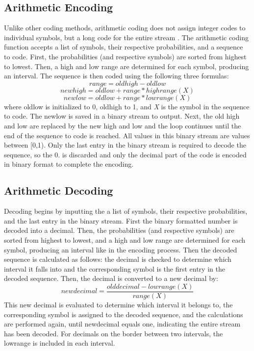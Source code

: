 \documentclass[11pt,a4paper,table]{article}
\begin{document}
\subsection{Arithmetic Encoding}
Unlike other coding methods, arithmetic coding does not assign integer codes to individual symbols, but a long code for the entire stream \cite{Salomon2007}. The arithmetic coding function accepts a list of symbols, their respective probabilities, and a sequence to code. First, the probabilities (and respective symbols) are sorted from highest to lowest. Then, a high and low range are determined for each symbol, producing an interval. The sequence is then coded using the following three formulas:
\begin{equation}
range = oldhigh - oldlow
\end{equation}
\begin{equation}
newhigh = oldlow + range*highrange(X)
\end{equation}
\begin{equation}
newlow = old low + range*lowrange(X)
\end{equation}
where oldlow is initialized to 0, oldhigh to 1, and \textit{X} is the symbol in the sequence to code. The newlow is saved in a binary stream to output. Next, the old high and low are replaced by the new high and low and the loop continues until the end of the sequence to code is reached. All values in this binary stream are values between [0,1). Only the last entry in the binary stream is required to decode the sequence, so the 0. is discarded and only the decimal part of the code is encoded in binary format to complete the encoding.

\subsection{Arithmetic Decoding}
Decoding begins by inputting the a list of symbols, their respective probabilities, and the last entry in the binary stream. First the binary formatted number is decoded into a decimal. Then, the probabilities (and respective symbols) are sorted from highest to lowest, and a high and low range are determined for each symbol, producing an interval like in the encoding process. Then the decoded sequence is calculated as follows: the decimal is checked to determine which interval it falls into and the corresponding symbol is the first entry in the decoded sequence. Then, the decimal is converted to a new decimal by:
 \begin{equation}
newdecimal = \frac{olddecimal - lowrange(X)}{range(X)}
\end{equation}
This new decimal is evaluated to determine which interval it belongs to, the corresponding symbol is assigned to the decoded sequence, and the calculations are performed again, until newdecimal equals one, indicating the entire stream has been decoded. For decimals on the border between two intervals, the lowrange is included in each interval.
\end{document}
